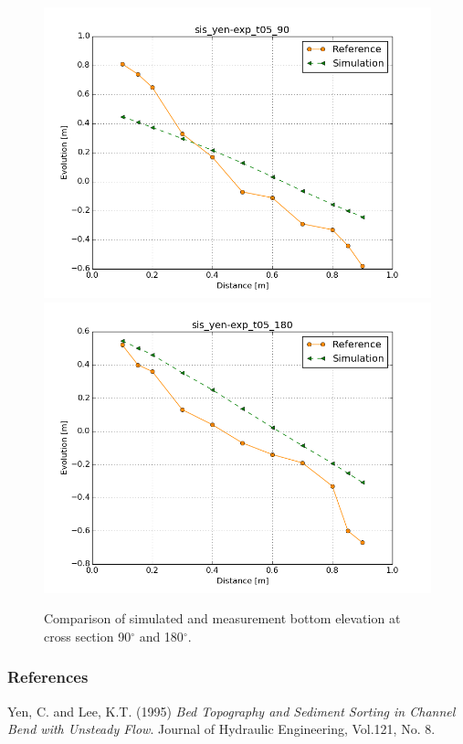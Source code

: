 \begin{figure} [!h]
\centering
\includegraphics[width=.96\textwidth]{../img/sis_yen-exp_90.png}
\includegraphics[width=.96\textwidth]{../img/sis_yen-exp_180.png}
 \caption{Comparison of simulated and measurement bottom elevation at cross section 90$^{\circ}$ and 180$^{\circ}$.}\label{fig:results2}
\end{figure}



\subsubsection{References}
%
Yen, C. and Lee, K.T. (1995) \textit{ Bed Topography and Sediment Sorting in Channel Bend 
with Unsteady Flow}. Journal of Hydraulic Engineering, Vol.121, No. 8.
